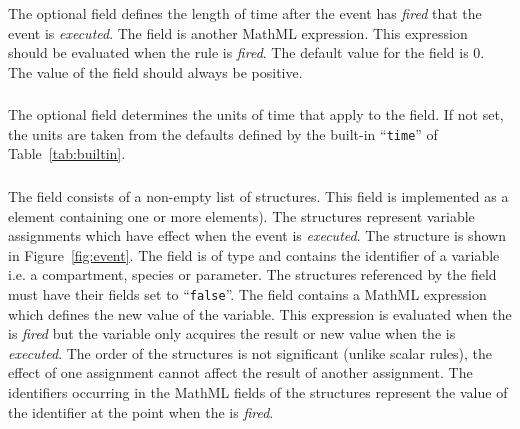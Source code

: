 \documentclass[10pt,twocolumntoc]{cekarticle}
\newcommand{\vref}[1]{\ref{#1}}
\begin{document}
\subsubsection{}
The optional  field defines the length of time after
the event has \emph{fired} that the event is \emph{executed}. The
 field is another MathML expression.  This
expression should be evaluated when the rule is \emph{fired}.  The
default value for the  field is 0.  The value of the
 field should always be positive.

\subsubsection{}
The optional field  determines the units of time
that apply to the  field. If not set, the units are
taken from the defaults defined by the built-in ``\texttt{time}''
of Table~\vref{tab:builtin}.

\subsubsection{}
The  field consists of a non-empty list of
 structures.  This field is implemented as a
 element containing one or more
 elements).  The 
structures represent variable assignments which have effect when
the event is \emph{executed}. The  structure is
shown in Figure~\ref{fig:event}. The  field is of
type  and contains the identifier of a variable i.e. a
compartment, species or parameter.  The structures referenced by
the  field must have their 
fields set to ``\texttt{false}''.  The  field
contains a MathML expression which defines the new value of the
variable.  This expression is evaluated when the  is
\emph{fired} but the variable only acquires the result or new
value when the  is \emph{executed}.  The order of the
 structures is not significant (unlike
scalar rules), the effect of one assignment cannot affect the
result of another assignment.  The identifiers occurring in the
MathML  fields of the 
structures represent the value of the identifier at the point when
the  is \emph{fired}.
\end{document}
